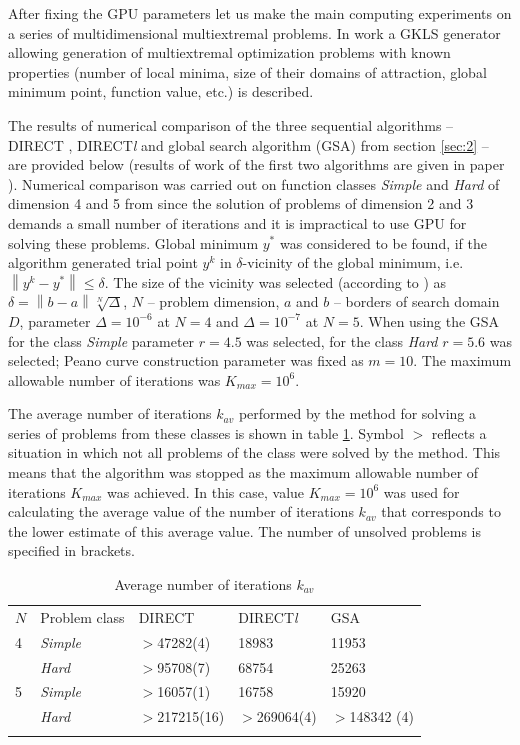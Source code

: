 \documentclass[smallcondensed]{svjour3}     %
\begin{document}
After fixing the GPU parameters let us make the main computing experiments on a series of multidimensional multiextremal problems. In work \cite{RefGaviano} a GKLS generator allowing generation of multiextremal optimization problems with known properties (number of local minima, size of their domains of attraction, global minimum point, function value, etc.) is described.  

The results of numerical comparison of the three sequential algorithms -- DIRECT \cite{RefJones}, DIRECT\textit{l} \cite{RefGablonsky} and global search algorithm (GSA) from section \ref{sec:2} -- are provided below (results of work of the first two algorithms are given in paper \cite{RefGaviano}). Numerical comparison was carried out on function classes \textit{Simple} and \textit{Hard} of dimension 4 and 5 from \cite{RefGaviano} since the solution of problems of dimension 2 and 3 demands a small number of iterations and it is impractical to use GPU for solving these problems. Global minimum $y^\ast$ was considered to be found, if the algorithm generated trial point $y^k$ in $\delta$-vicinity of the global minimum, i.e. $\left\|y^k-y^\ast\right\|\leq\delta$. The size of the vicinity was selected (according to \cite{RefGaviano}) as $\delta = \left\|b-a\right\|\sqrt[N]{\Delta}$, $N$ -- problem dimension, $a$ and $b$ -- borders of search domain $D$, parameter $\Delta=10^{-6}$ at $N=4$ and $\Delta=10^{-7}$ at $N=5$. When using the GSA for the class \textit{Simple} parameter $r=4.5$ was selected, for the class \textit{Hard} $r=5.6$ was selected; Peano curve construction parameter was fixed as $m=10$. The maximum allowable number of iterations was $K_{max} = 10^6$.

The average number of iterations $k_{av}$ performed by the method for solving a series of problems from these classes is shown in table \ref{tab:3}. Symbol $>$ reflects a situation in which not all problems of the class were solved by the method. This means that the algorithm was stopped as the maximum allowable number of iterations $K_{max}$ was achieved. In this case, value $K_{max}=10^6$ was used for calculating the average value of the number of iterations $k_{av}$ that corresponds to the lower estimate of this average value. The number of unsolved problems is specified in brackets.

\begin{table}
	\caption{Average number of iterations $k_{av}$}
	\label{tab:3}
	\center
	\begin{tabular}{lllll}
		\hline\noalign{\smallskip}
  	 $N$ & Problem class & DIRECT & DIRECT\textit{l} & GSA \\
		\noalign{\smallskip} \hline \noalign{\smallskip}
			4 &	\textit{Simple}	& $>$47282(4) &	18983 &	11953 \\
	      & \textit{Hard} &	$>$95708(7) &	68754 &	25263 \\
			5	& \textit{Simple} &	$>$16057(1) &	16758 &	15920 \\
				& \textit{Hard} &	$>$217215(16) &	$>$269064(4) & $>$148342 (4) \\
		\noalign{\smallskip}\hline
	\end{tabular}
\end{table}
\end{document}
